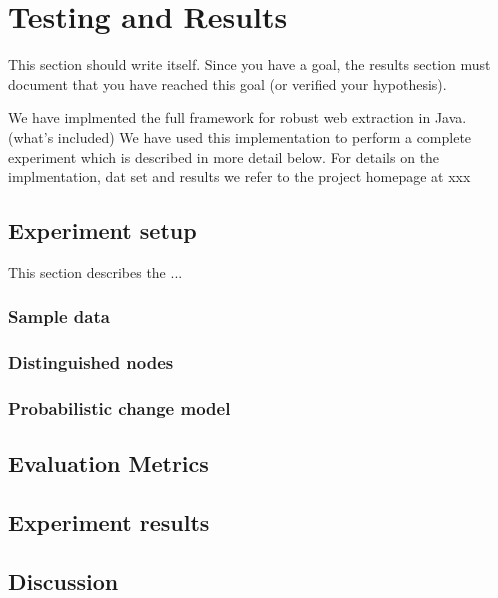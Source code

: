 \chapter{Testing and Results}

This section should write itself. Since you have a goal, the results section must document that you have reached this goal (or verified your hypothesis).

We have implmented the full framework for robust web extraction in Java. (what's included) We have used this implementation to perform a complete experiment which is described in more detail below. For details on the implmentation, dat set and results we refer to the project homepage at xxx

\section{Experiment setup}

This section describes the ...

\subsection{Sample data}
\subsection{Distinguished nodes}
\subsection{Probabilistic change model}

\section{Evaluation Metrics}

\section{Experiment results}

\section{Discussion}

